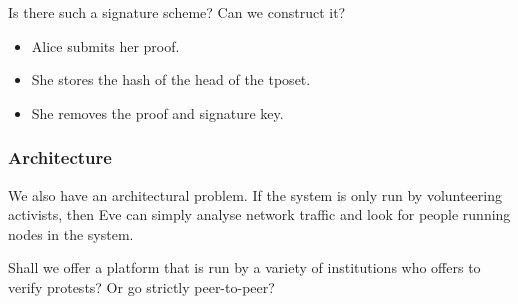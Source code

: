 
\begin{frame}
  \begin{question}
    Is there such a signature scheme?
    Can we construct it?
  \end{question}

  \pause{}

  \begin{remark}
    \begin{itemize}
      \item Alice submits her proof.
      \item She stores the hash of the head of the \ac{tposet}.
      \item She removes the proof and signature key.
    \end{itemize}
  \end{remark}
\end{frame}

\subsubsection{Architecture}

We also have an architectural problem.
If the system is only run by volunteering activists, then Eve can simply 
analyse network traffic and look for people running nodes in the system.

\begin{question}
  Shall we offer a platform that is run by a variety of institutions who 
  offers to verify protests?
  Or go strictly peer-to-peer?
\end{question}

